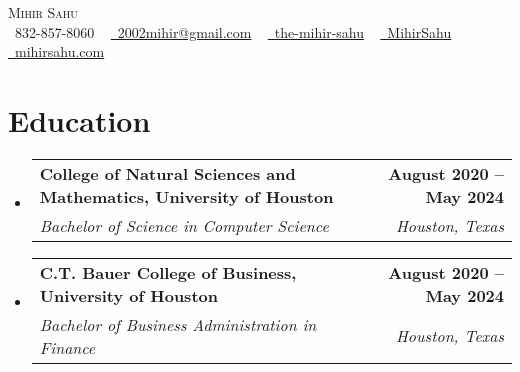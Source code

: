 \documentclass[letterpaper,11pt]{article}
\makeatletter
\newcommand{\resumeSubheading}[4]{
  \vspace{-2pt}\item
    \begin{tabular*}{1.0\textwidth}[t]{l@{\extracolsep{\fill}}r}
      \textbf{#1} & \textbf{\small #2} \\
      \textit{\small#3} & \textit{\small #4} \\
    \end{tabular*}\vspace{-7pt}
}
\newcommand{\resumeSubHeadingListStart}{\begin{itemize}[leftmargin=0.0in, label={}]}
\newcommand{\resumeSubHeadingListEnd}{\end{itemize}}
\makeatother
\begin{document}

\begin{center}
    {\Huge \scshape Mihir Sahu} \\ \vspace{1pt}
    \small \raisebox{-0.1\height}\faPhone\ 832-857-8060 ~ \href{mailto:2002mihir@gmail.com}{\raisebox{-0.2\height}\faEnvelope\  2002mihir@gmail.com} ~ 
    \href{https://linkedin.com/in/the-mihir-sahu}{\raisebox{-0.2\height}\faLinkedin\ the-mihir-sahu}  ~
    \href{https://github.com/MihirSahu}{\raisebox{-0.2\height}\faGithub\ MihirSahu} ~
    \href{https://mihirsahu.com}{\raisebox{-0.2\height}\faGlobeAmericas\ mihirsahu.com}
    \vspace{-8pt}
\end{center}


\section{Education}
  \resumeSubHeadingListStart
    \resumeSubheading
      {College of Natural Sciences and Mathematics, University of Houston}{August 2020 -- May 2024}
      {Bachelor of Science in Computer Science}{Houston, Texas}
    \resumeSubheading
      {C.T. Bauer College of Business, University of Houston}{August 2020 -- May 2024}
      {Bachelor of Business Administration in Finance}{Houston, Texas}
  \resumeSubHeadingListEnd
  
\end{document}
